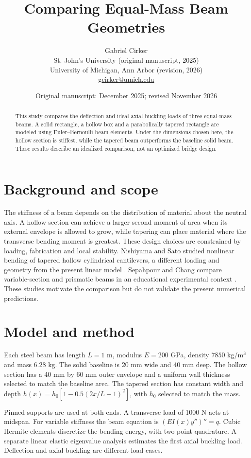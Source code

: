 \documentclass[11pt]{article}
\title{Comparing Equal-Mass Beam Geometries}
\author{Gabriel Cirker\\\small St. John's University (original manuscript, 2025)\\\small University of Michigan, Ann Arbor (revision, 2026)\\\small \href{mailto:gcirker@umich.edu}{gcirker@umich.edu}}
\date{Original manuscript: December 2025; revised November 2026}
\begin{document}
\maketitle
\begin{abstract}
This study compares the deflection and ideal axial buckling loads of three equal-mass beams. A solid rectangle, a hollow box and a parabolically tapered rectangle are modeled using Euler--Bernoulli beam elements. Under the dimensions chosen here, the hollow section is stiffest, while the tapered beam outperforms the baseline solid beam. These results describe an idealized comparison, not an optimized bridge design.
\end{abstract}
\section{Background and scope}
The stiffness of a beam depends on the distribution of material about the neutral axis. A hollow section can achieve a larger second moment of area when its external envelope is allowed to grow, while tapering can place material where the transverse bending moment is greatest. These design choices are constrained by loading, fabrication and local stability. Nishiyama and Sato studied nonlinear bending of tapered hollow cylindrical cantilevers, a different loading and geometry from the present linear model \cite{nishiyama}. Sepahpour and Chang compare variable-section and prismatic beams in an educational experimental context \cite{sepahpour}. These studies motivate the comparison but do not validate the present numerical predictions.

\section{Model and method}
Each steel beam has length $L=1$ m, modulus $E=200$ GPa, density $7850$ kg/m$^3$ and mass 6.28 kg. The solid baseline is 20 mm wide and 40 mm deep. The hollow section has a 40 mm by 60 mm outer envelope and a uniform wall thickness selected to match the baseline area. The tapered section has constant width and depth $h(x)=h_0[1-0.5(2x/L-1)^2]$, with $h_0$ selected to match the mass.

Pinned supports are used at both ends. A transverse load of 1000 N acts at midspan. For variable stiffness the beam equation is $(EI(x)y'')''=q$. Cubic Hermite elements discretize the bending energy, with two-point quadrature. A separate linear elastic eigenvalue analysis estimates the first axial buckling load. Deflection and axial buckling are different load cases.
\end{document}

